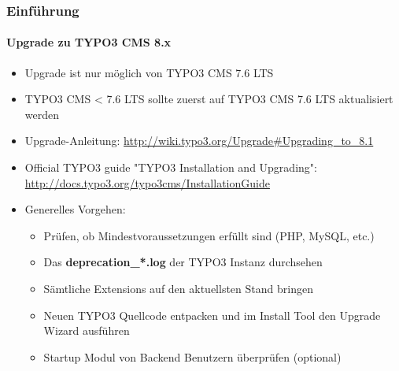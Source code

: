 \begin{frame}[fragile]
	\frametitle{Einführung}
	\framesubtitle{Upgrade zu TYPO3 CMS 8.x}

	\begin{itemize}
		\item Upgrade ist nur möglich von TYPO3 CMS 7.6 LTS
		\item TYPO3 CMS < 7.6 LTS sollte zuerst auf TYPO3 CMS 7.6 LTS aktualisiert werden
	\end{itemize}

	\begin{itemize}

		\item Upgrade-Anleitung:\newline
			\smaller\url{http://wiki.typo3.org/Upgrade#Upgrading_to_8.1}\normalsize
		\item Official TYPO3 guide "TYPO3 Installation and Upgrading":
			\smaller\url{http://docs.typo3.org/typo3cms/InstallationGuide}\normalsize
		\item Generelles Vorgehen:
			\begin{itemize}
				\item Prüfen, ob Mindestvoraussetzungen erfüllt sind \small(PHP, MySQL, etc.)
				\item Das \textbf{deprecation\_*.log} der TYPO3 Instanz durchsehen
				\item Sämtliche Extensions auf den aktuellsten Stand bringen
				\item Neuen TYPO3 Quellcode entpacken und im Install Tool den Upgrade Wizard ausführen
				\item Startup Modul von Backend Benutzern überprüfen (optional)
			\end{itemize}
	\end{itemize}

\end{frame}



